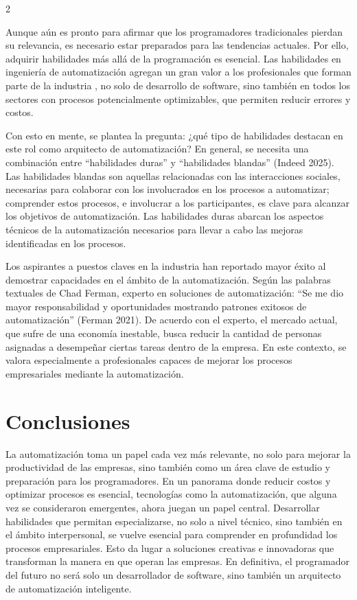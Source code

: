 \documentclass[12pt,spanish,Letterpaper,openany]{book}
\begin{document}
\begin {multicols}{2}
\begin {flushleft}
\begin{minipage}[c]{\columnwidth}
\end{minipage}
\end {flushleft}

Aunque aún es pronto para afirmar que los programadores tradicionales pierdan su
relevancia, es necesario estar preparados para las tendencias actuales. Por ello, adquirir
habilidades más allá de la programación es esencial. Las habilidades en ingeniería de
automatización agregan un gran valor a los profesionales que forman parte de la industria , no
solo de desarrollo de software, sino también en todos los sectores con procesos
potencialmente optimizables, que permiten reducir errores y costos.

Con esto en mente, se plantea la pregunta: ¿qué tipo de habilidades destacan en este rol como
arquitecto de automatización? En general, se necesita una combinación entre ``habilidades
duras'' y ``habilidades blandas'' (Indeed 2025). Las habilidades blandas son aquellas
relacionadas con las interacciones sociales, necesarias para colaborar con los involucrados en
los procesos a automatizar; comprender estos procesos, e involucrar a los participantes, es
clave para alcanzar los objetivos de automatización. Las habilidades duras abarcan los
aspectos técnicos de la automatización necesarios para llevar a cabo las mejoras identificadas
en los procesos.

Los aspirantes a puestos claves en la industria han reportado mayor éxito al demostrar
capacidades en el ámbito de la automatización. Según las palabras textuales de Chad Ferman,
experto en soluciones de automatización: ``Se me dio mayor responsabilidad y oportunidades mostrando patrones exitosos de automatización'' (Ferman 2021). De acuerdo con el experto,
el mercado actual, que sufre de una economía inestable, busca reducir la cantidad de personas
asignadas a desempeñar ciertas tareas dentro de la empresa. En este contexto, se valora
especialmente a profesionales capaces de mejorar los procesos empresariales mediante la
automatización.

\hypertarget{conclusiones-12}{%
\section{Conclusiones}\label{conclusiones-12}}

La automatización toma un papel cada vez más relevante, no solo para mejorar la
productividad de las empresas, sino también como un área clave de estudio y preparación
para los programadores. En un panorama donde reducir costos y optimizar procesos es
esencial, tecnologías como la automatización, que alguna vez se consideraron emergentes,
ahora juegan un papel central. Desarrollar habilidades que permitan especializarse, no solo a
nivel técnico, sino también en el ámbito interpersonal, se vuelve esencial para comprender en
profundidad los procesos empresariales. Esto da lugar a soluciones creativas e innovadoras
que transforman la manera en que operan las empresas. En definitiva, el programador del
futuro no será solo un desarrollador de software, sino también un arquitecto de
automatización inteligente.


\end{multicols}
\end{document}
